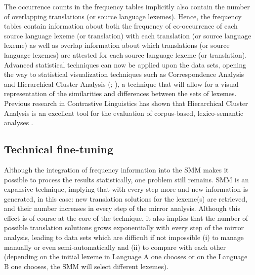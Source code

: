 The occurrence counts in the frequency tables implicitly also contain the number of overlapping translations (or source language lexemes). Hence, the frequency tables contain information about both the frequency of co-occurrence of each source language lexeme (or translation) with each translation (or source language lexeme) as well as overlap information about which translations (or source language lexemes) are attested for each source language lexeme (or translation). Advanced statistical techniques can now be applied upon the data sets, opening the way to statistical visualization techniques such as Correspondence Analysis \citep{greenacre_correspondence_2007,lebart_exploring_1998} and Hierarchical Cluster Analysis (\citealp[138]{baayen_analyzing_2008}; \citealp[336]{gries_statistics_2013}), a technique that will allow for a visual representation of the similarities and differences between the sets of lexemes. Previous research in Contrastive Linguistics has shown that Hierarchical Cluster Analysis is an excellent tool for the evaluation of corpus-based, lexico-semantic analyses \citep{evans_behavioral_2009,libben_behavioral_2012,glynn_cluster_2014}.


\subsection{Technical fine-tuning}
\label{sec:3.5.3}
Although the integration of frequency information into the SMM makes it possible to process the results statistically, one problem still remains. SMM is an expansive technique, implying that with every step more and new information is generated, in this case: new translation solutions for the lexeme(s) are retrieved, and their number increases in every step of the mirror analysis. Although this effect is of course at the core of the technique, it also implies that the number of possible translation solutions grows exponentially with every step of the mirror analysis, leading to data sets which are difficult if not impossible (i) to manage manually or even semi-automatically and (ii) to compare with each other (depending on the initial lexeme in Language A one chooses or on the Language B one chooses, the SMM will select different lexemes).


